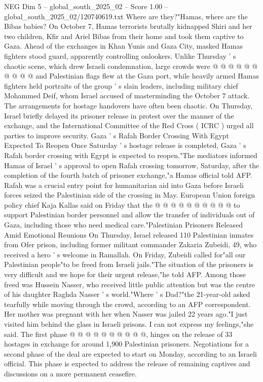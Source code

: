 \begin{textsample}{NEG Dim 5 – global\_south\_2025\_02 – Score 1.00 – global\_south\_2025\_02/120740619.txt}
Where are they?"Hamas, where are the Bibas babies?
On October 7, Hamas terrorists brutally kidnapped Shiri and her two children, Kfir and Ariel Bibas from their home and took them captive to Gaza.
Ahead of the exchanges in Khan Yunis and Gaza City, masked Hamas fighters stood guard, apparently controlling onlookers.
Unlike Thursday ' s chaotic scene, which drew Israeli condemnation, large crowds were @ @ @ @ @ @ @ @ @ @ and Palestinian flags flew at the Gaza port, while heavily armed Hamas fighters held portraits of the group ' s slain leaders, including military chief Mohammed Deif, whom Israel accused of masterminding the October 7 attack.
The arrangements for hostage handovers have often been chaotic.
On Thursday, Israel briefly delayed its prisoner release in protest over the manner of the exchange, and the International Committee of the Red Cross ( ICRC ) urged all parties to improve security.
Gaza ' s Rafah Border Crossing With Egypt Expected To Reopen Once Saturday ' s hostage release is completed, Gaza ' s Rafah border crossing with Egypt is expected to reopen."The mediators informed Hamas of Israel ' s approval to open Rafah crossing tomorrow, Saturday, after the completion of the fourth batch of prisoner exchange,"a Hamas official told AFP.
Rafah was a crucial entry point for humanitarian aid into Gaza before Israeli forces seized the Palestinian side of the crossing in May.
European Union foreign policy chief Kaja Kallas said on Friday that the @ @ @ @ @ @ @ @ @ @ to support Palestinian border personnel and allow the transfer of individuals out of Gaza, including those who need medical care."Palestinian Prisoners Released Amid Emotional Reunions On Thursday, Israel released 110 Palestinian inmates from Ofer prison, including former militant commander Zakaria Zubeidi, 49, who received a hero ' s welcome in Ramallah.
On Friday, Zubeidi called for"all our Palestinian people"to be freed from Israeli jails."The situation of the prisoners is very difficult and we hope for their urgent release,"he told AFP.
Among those freed was Hussein Nasser, who received little public attention but was the centre of his daughter Raghda Nasser ' s world."Where ' s Dad?"the 21-year-old asked tearfully while moving through the crowd, according to an AFP correspondent.
Her mother was pregnant with her when Nasser was jailed 22 years ago."I just visited him behind the glass in Israeli prisons.
I can not express my feelings,"she said.
The first phase @ @ @ @ @ @ @ @ @ @, hinges on the release of 33 hostages in exchange for around 1,900 Palestinian prisoners.
Negotiations for a second phase of the deal are expected to start on Monday, according to an Israeli official.
This phase is expected to address the release of remaining captives and discussions on a more permanent ceasefire.

\end{textsample}
